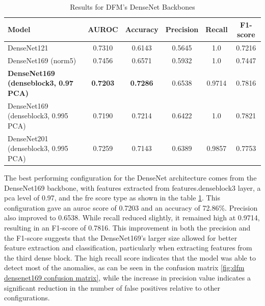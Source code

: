 \begin{table}[ht!]
    \centering
    \begin{tabular}{|l|c|c|c|c|c|}
        \hline
        \textbf{Model} & \textbf{AUROC} & \textbf{Accuracy} & \textbf{Precision} & \textbf{Recall} & \textbf{F1-score} \\ \hline
        DenseNet121 & 0.7310 & 0.6143 & 0.5645 & 1.0 & 0.7216 \\ \hline
        DenseNet169 (norm5) & 0.7456 & 0.6571 & 0.5932 & 1.0 & 0.7447 \\ \hline
        \textbf{DenseNet169 (denseblock3, 0.97 PCA)} & \textbf{0.7203} & \textbf{0.7286} & 0.6538 & 0.9714 & 0.7816 \\ \hline
        DenseNet169 (denseblock3, 0.995 PCA) & 0.7190 & 0.7214 & 0.6422 & 1.0 & 0.7821 \\ \hline
        DenseNet201 (denseblock3, 0.995 PCA) & 0.7259 & 0.7143 & 0.6389 & 0.9857 & 0.7753 \\ \hline
    \end{tabular}
    \caption{Results for DFM's DenseNet Backbones}
    \label{tab:dfm densenet results}
\end{table}

The best performing configuration for the DenseNet architecture comes from the DenseNet169 backbone, with features extracted from features.denseblock3 layer, a \gls{pca} level of 0.97, and the \gls{fre} score type as shown in the table \ref{tab:dfm densenet results}. This configuration gave an \gls{auroc} score of 0.7203 and an accuracy of 72.86\%. Precision also improved to 0.6538. While recall reduced slightly, it remained high at 0.9714, resulting in an F1-score of 0.7816. This improvement in both the precision and the F1-score suggests that the DenseNet169's larger size allowed for better feature extraction and classification, particularly when extracting features from the third dense block. The high recall score indicates that the model was able to detect most of the anomalies, as can be seen in the confusion matrix \ref{fig:dfm densenet169 confusion matrix}, while the increase in precision value indicates a significant reduction in the number of false positives relative to other configurations.

